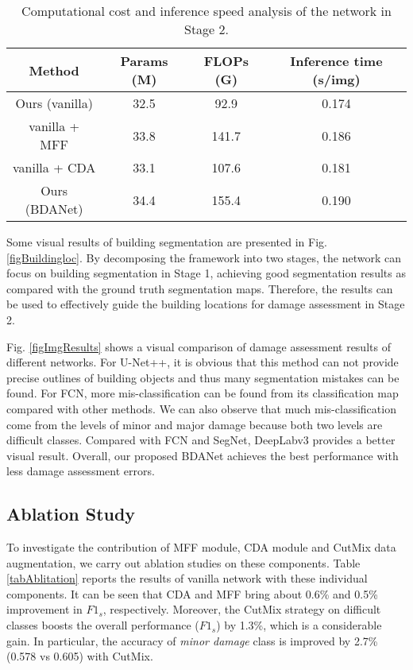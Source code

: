 \documentclass[journal]{IEEEtran}
\begin{document}
\begin{table}[!t]
	\centering
	\caption{Computational cost and inference speed analysis of the network in Stage 2.}
	\setlength{\tabcolsep}{1.15mm} {
	\begin{tabular}{c|ccc}
		\hline \hline
    \textbf{Method}     & Params (M)   & FLOPs (G)  & Inference time (s/img) \\
    \hline
     Ours (vanilla)  & 32.5  & 92.9  &0.174\\
     vanilla + MFF & 33.8 & 141.7  & 0.186\\
     vanilla + CDA    & 33.1  &  107.6  &0.181  \\
     Ours (BDANet) & 34.4 & 155.4 & 0.190\\
	\hline
	\end{tabular}}
\label{tabParam}
\end{table}

Some visual results of building segmentation are presented in Fig. \ref{figBuildingloc}. By decomposing the framework into two stages, the network can focus on building segmentation in Stage 1, achieving good segmentation results as compared with the ground truth segmentation maps. 
Therefore, the results can be used to effectively guide the building locations for damage assessment in Stage 2.

Fig. \ref{figImgResults} shows a visual comparison of damage assessment results of different networks. For U-Net++, it is obvious that this method can not provide precise outlines of building objects and thus many segmentation mistakes can be found. For FCN, more mis-classification can be found from its classification map compared with other methods. We can also observe that much mis-classification come from the levels of minor  and major damage because both two levels are difficult classes. Compared with FCN and SegNet, DeepLabv3 provides a better visual result. Overall, our proposed BDANet achieves the best performance with less damage assessment errors. 



\subsection{Ablation Study}
To investigate the contribution of MFF module, CDA module and CutMix data augmentation, we carry out ablation studies on these components. Table \ref{tabAblitation} reports the results of vanilla network with these individual components. It can be seen that CDA and MFF bring about 0.6\% and 0.5\% improvement in $F1_s$, respectively.  Moreover, the CutMix strategy on difficult classes boosts the overall performance ($F1_s$) by 1.3\%, which is a considerable gain. In particular, the accuracy of \textit{minor damage} class is improved by 2.7\% (0.578 vs 0.605) with CutMix. 
\end{document}
